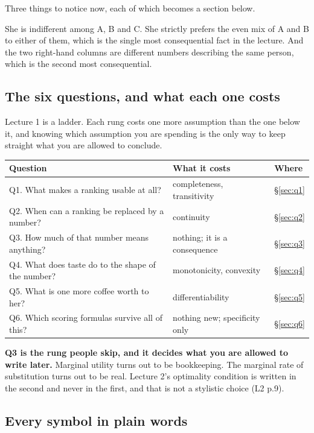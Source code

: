 \documentclass[11pt,letterpaper]{article}
\theoremstyle{definition}
\theoremstyle{plain}
\newcommand{\src}[1]{{\small\textsf{(#1)}}}
\begin{document}
Three things to notice now, each of which becomes a section below.

She is indifferent among A, B and C. She strictly prefers the even mix of A and B to either of them,
which is the single most consequential fact in the lecture. And the two right-hand columns are
different numbers describing the same person, which is the second most consequential.

\subsection{The six questions, and what each one costs}

Lecture 1 is a ladder. Each rung costs one more assumption than the one below it, and knowing which
assumption you are spending is the only way to keep straight what you are allowed to conclude.

\begin{center}
\begin{tabular}{@{}p{} p{} p{}@{}}
\toprule
\textbf{Question} & \textbf{What it costs} & \textbf{Where} \\
\midrule
Q1. What makes a ranking usable at all? & completeness, transitivity & \S\ref{sec:q1} \\
Q2. When can a ranking be replaced by a number? & continuity & \S\ref{sec:q2} \\
Q3. How much of that number means anything? & nothing; it is a consequence & \S\ref{sec:q3} \\
Q4. What does taste do to the shape of the number? & monotonicity, convexity & \S\ref{sec:q4} \\
Q5. What is one more coffee worth to her? & differentiability & \S\ref{sec:q5} \\
Q6. Which scoring formulas survive all of this? & nothing new; specificity only & \S\ref{sec:q6} \\
\bottomrule
\end{tabular}
\end{center}

\textbf{Q3 is the rung people skip, and it decides what you are allowed to write later.} Marginal
utility turns out to be bookkeeping. The marginal rate of substitution turns out to be real. Lecture
2's optimality condition is written in the second and never in the first, and that is not a stylistic
choice \src{L2 p.9}.

\subsection{Every symbol in plain words}
\end{document}
